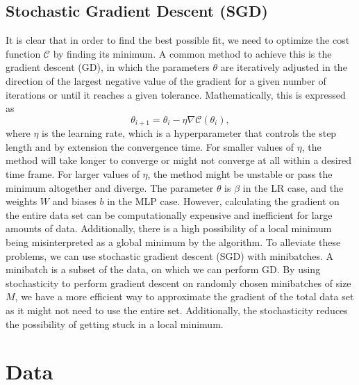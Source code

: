 \documentclass[a4paper, 11pt, twocolumn]{article}
\begin{document}
\subsection{Stochastic Gradient Descent (SGD)}
It is clear that in order to find the best possible fit, we need to optimize the cost function $\mathcal{C}$ by finding its minimum. A common method to achieve this is the gradient descent (GD), in which the parameters $\theta$ are iteratively adjusted in the direction of the largest negative value of the gradient for a given number of iterations or until it reaches a given tolerance. Mathematically, this is expressed as
\begin{equation}
\theta_{i+1} = \theta_i -\eta \nabla \mathcal{C}(\theta_i),
\end{equation}
where $\eta$ is the learning rate, which is a hyperparameter that controls the step length and by extension the convergence time. For smaller values of $\eta$, the method will take longer to converge or might not converge at all within a desired time frame. For larger values of $\eta$, the method might be unstable or pass the minimum altogether and diverge. The parameter $\theta$ is $\beta$ in the LR case, and the weights $W$ and biases $b$ in the MLP case.  
However, calculating the gradient on the entire data set can be computationally expensive and inefficient for large amounts of data. Additionally, there is a high possibility of a local minimum being misinterpreted as a global minimum by the algorithm. 
To alleviate these problems, we can use stochastic gradient descent (SGD) with minibatches.  A minibatch is a subset of the data, on which we can perform GD. By using stochasticity to perform gradient descent on randomly chosen minibatches of size $M$, we have a more efficient way to approximate the gradient of the total data set as it might not need to use the entire set. Additionally, the stochasticity reduces the possibility of getting stuck in a local minimum.

\section{Data}
\end{document}
